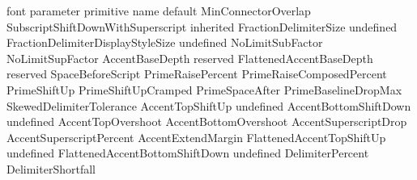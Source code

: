 \starttabulate[|T|T|c|]
\FL
\BC font parameter                    \BC primitive name                             \BC default   \NC \NR
\TL
\NC MinConnectorOverlap               \NC \type {\Umathconnectoroverlapmin}                     \NC \NR
\NC SubscriptShiftDownWithSuperscript \NC \type {\Umathsubsupshiftdown}                \NC inherited \NC \NR
\NC FractionDelimiterSize             \NC \type {\Umathfractiondelsize}                \NC undefined \NC \NR
\NC FractionDelimiterDisplayStyleSize \NC \type {\Umathfractiondelsize}                \NC undefined \NC \NR
\NC NoLimitSubFactor                  \NC \type {\Umathnolimitsupfactor}                        \NC \NR
\NC NoLimitSupFactor                  \NC \type {\Umathnolimitsubfactor}                        \NC \NR
\NC AccentBaseDepth                   \NC \type {\Umathaccentbasedepth}                \NC reserved  \NC \NR
\NC FlattenedAccentBaseDepth          \NC \type {\Umathflattenedaccentbasedepth}       \NC reserved  \NC \NR
\NC SpaceBeforeScript                 \NC \type {\Umathspacebeforescript}                       \NC \NR
\NC PrimeRaisePercent                 \NC \type {\Umathprimeraise}                              \NC \NR
\NC PrimeRaiseComposedPercent         \NC \type {\Umathprimeraisecomposed}                      \NC \NR
\NC PrimeShiftUp                      \NC \type {\Umathprimeshiftup}                            \NC \NR
\NC PrimeShiftUpCramped               \NC \type {\Umathprimeshiftup}                            \NC \NR
\NC PrimeSpaceAfter                   \NC \type {\Umathprimespaceafter}                         \NC \NR
\NC PrimeBaselineDropMax              \NC \type {\Umathprimeshiftdrop}                          \NC \NR
\NC SkewedDelimiterTolerance          \NC \type {\Umathskeweddelimitertolerance}                \NC \NR
\NC AccentTopShiftUp                  \NC \type {\Umathaccenttopshiftup}               \NC undefined \NC \NR
\NC AccentBottomShiftDown             \NC \type {\Umathaccentbottomshiftdown}          \NC undefined \NC \NR
\NC AccentTopOvershoot                \NC \type {\Umathaccenttopovershoot}                      \NC \NR
\NC AccentBottomOvershoot             \NC \type {\Umathaccentbottomovershoot}                   \NC \NR
\NC AccentSuperscriptDrop             \NC \type {\Umathaccentsuperscriptdrop}                   \NC \NR
\NC AccentSuperscriptPercent          \NC \type {\Umathaccentsuperscriptpercent}                \NC \NR
\NC AccentExtendMargin                \NC \type {\Umathaccentextendmargin}                      \NC \NR
\NC FlattenedAccentTopShiftUp         \NC \type {\Umathflattenedaccenttopshiftup}      \NC undefined \NC \NR
\NC FlattenedAccentBottomShiftDown    \NC \type {\Umathflattenedaccentbottomshiftdown} \NC undefined \NC \NR
\NC DelimiterPercent                  \NC \type {\Umathdelimiterpercent}                        \NC \NR
\NC DelimiterShortfall                \NC \type {\Umathdelimitershortfall}                      \NC \NR
\LL
\stoptabulate

